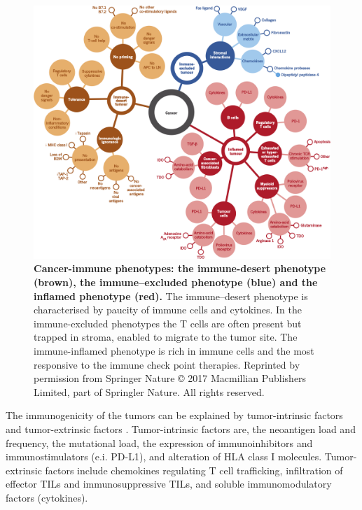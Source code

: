 \documentclass[12pt,]{book}
\theoremstyle{definition}
\theoremstyle{definition}
\theoremstyle{definition}
\theoremstyle{remark}
\begin{document}
\begin{figure}

{\centering \includegraphics[width=1\linewidth]{figures-ext/immune-phenotypes} 

}

\caption{\textbf{Cancer-immune phenotypes: the
immune-desert phenotype (brown), the immune--excluded phenotype (blue)
and the inflamed phenotype (red).} The immune--desert phenotype is
characterised by paucity of immune cells and cytokines. In the
immune-excluded phenotypes the T cells are often present but trapped in
stroma, enabled to migrate to the tumor site. The immune-inflamed
phenotype is rich in immune cells and the most responsive to the immune
check point therapies. Reprinted by permission from Springer Nature
\citep{Chen2017} © 2017 Macmillian Publishers Limited, part of Springler
Nature. All rights reserved.}\label{fig:immune-phenotypes}
\end{figure}












The immunogenicity of the tumors can be explained by tumor-intrinsic
factors and tumor-extrinsic factors \citep{Gajewski2006}.
Tumor-intrinsic factors are, the neoantigen load and frequency, the
mutational load, the expression of immunoinhibitors and
immunostimulators (e.i. PD-L1), and alteration of HLA class I molecules.
Tumor-extrinsic factors include chemokines regulating T cell
trafficking, infiltration of effector TILs and immunosuppressive TILs,
and soluble immunomodulatory factors (cytokines).
\end{document}
